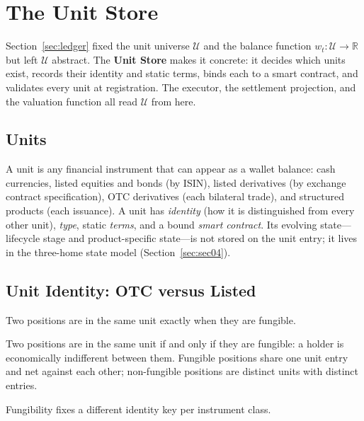 \section{The Unit Store}
\label{sec:sec03}
\label{sec:unit-store}
\newtheorem*{condition}{Condition}

Section~\ref{sec:ledger} fixed the unit universe $\mathcal{U}$ and the balance function $w_t : \mathcal{U} \to \mathbb{R}$ but left $\mathcal{U}$ abstract. The \textbf{Unit Store} makes it concrete: it decides which units exist, records their identity and static terms, binds each to a smart contract, and validates every unit at registration. The executor, the settlement projection, and the valuation function all read $\mathcal{U}$ from here.

\subsection{Units}

A unit is any financial instrument that can appear as a wallet balance: cash currencies, listed equities and bonds (by ISIN), listed derivatives (by exchange contract specification), OTC derivatives (each bilateral trade), and structured products (each issuance). A unit has \emph{identity} (how it is distinguished from every other unit), \emph{type}, static \emph{terms}, and a bound \emph{smart contract}. Its evolving state---lifecycle stage and product-specific state---is not stored on the unit entry; it lives in the three-home state model (Section~\ref{sec:sec04}).

\subsection{Unit Identity: OTC versus Listed}
\label{sec:sec03-identity}
\label{sec:unit-identity}

Two positions are in the same unit exactly when they are fungible.

\begin{principle}
\label{prin:unit-identity}
Two positions are in the same unit if and only if they are fungible: a holder is economically indifferent between them. Fungible positions share one unit entry and net against each other; non-fungible positions are distinct units with distinct entries.
\end{principle}

Fungibility fixes a different identity key per instrument class.

